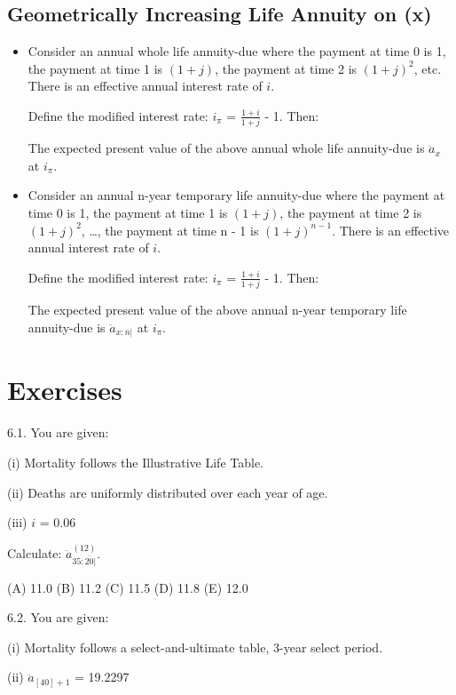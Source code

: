 \documentclass[]{book}
\begin{document}
\subsection{Geometrically Increasing Life Annuity on
(x)}\label{geometrically-increasing-life-annuity-on-x}

\begin{itemize}
\item
  Consider an annual whole life annuity-due where the payment at time 0
  is 1, the payment at time 1 is \((1 + j)\), the payment at time 2 is
  \((1 + j)^2\), etc. There is an effective annual interest rate of
  \(i\).

  Define the modified interest rate: \(i_{\pi}\) =
  \(\frac{1 + i}{1 + j}\) - 1. Then:

  The expected present value of the above annual whole life annuity-due
  is \(\ddot{a}_x\) at \(i_{\pi}\).
\item
  Consider an annual n-year temporary life annuity-due where the payment
  at time 0 is 1, the payment at time 1 is \((1 + j)\), the payment at
  time 2 is \((1 + j)^2\), \ldots{}, the payment at time n - 1 is
  \((1 + j)^{n - 1}\). There is an effective annual interest rate of
  \(i\).

  Define the modified interest rate: \(i_{\pi}\) =
  \(\frac{1 + i}{1 + j}\) - 1. Then:

  The expected present value of the above annual n-year temporary life
  annuity-due is \(\ddot{a}_{x:\overline{n}|}\) at \(i_{\pi}\).
\end{itemize}

\section{Exercises}\label{exercises-3}

6.1. You are given:

(i) Mortality follows the Illustrative Life Table.

(ii) Deaths are uniformly distributed over each year of age.

(iii) \(i\) = 0.06

Calculate: \(\ddot{a}_{35:\overline{20}|}^{(12)}\).

(A) 11.0 (B) 11.2 (C) 11.5 (D) 11.8 (E) 12.0

6.2. You are given:

(i) Mortality follows a select-and-ultimate table, 3-year select period.

(ii) \(\ddot{a}_{[40] + 1}\) = 19.2297
\end{document}
